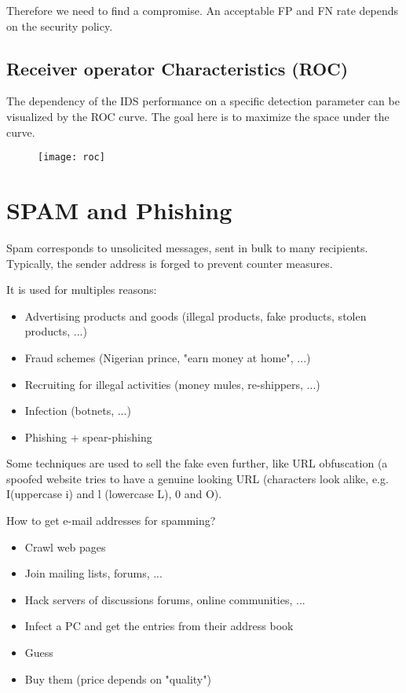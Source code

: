 Therefore we need to find a compromise. An acceptable FP and FN rate depends on the security policy.

\section{Receiver operator Characteristics (ROC)}

The dependency of the IDS performance on a specific detection parameter can be visualized by the ROC curve. The goal here is to maximize the space under the curve.

\begin{figure}[H]
    \centering
    \texttt{[image: roc]}
\end{figure}

\chapter{SPAM and Phishing}

Spam corresponds to unsolicited messages, sent in bulk to many recipients. Typically, the sender address is forged to prevent counter measures.

It is used for multiples reasons:
\begin{itemize}
    \item Advertising products and goods (illegal products, fake products, stolen products, ...)
    \item Fraud schemes (Nigerian prince, "earn money at home", ...)
    \item Recruiting for illegal activities (money mules, re-shippers, ...)
    \item Infection (botnets, ...)
    \item Phishing + spear-phishing
\end{itemize}

Some techniques are used to sell the fake even further, like URL obfuscation (a spoofed website tries to have a genuine looking URL (characters look alike, e.g. I(uppercase i) and l (lowercase L), 0 and O).

How to get e-mail addresses for spamming?
\begin{itemize}
    \item Crawl web pages
    \item Join mailing lists, forums, ...
    \item Hack servers of discussions forums, online communities, ...
    \item Infect a PC and get the entries from their address book
    \item Guess
    \item Buy them (price depends on "quality")
\end{itemize}

